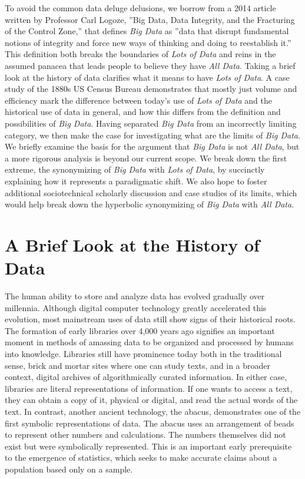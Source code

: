 \documentclass[sigconf]{acmart}
\begin{document}
To avoid the common data deluge delusions, we borrow from a 2014 article written by Professor Carl Logoze, ''Big Data, Data Integrity, and the Fracturing of the Control Zone,'' that defines {\em Big Data} as ''data that disrupt fundamental notions of integrity and force new ways of thinking and doing to reestablish it.''\cite{Keystone} This definition both breaks the boundaries of {\em Lots of Data} and reins in the assumed panacea that leads people to believe they have {\em All Data}. Taking a brief look at the history of data clarifies what it means to have {\em Lots of Data}. A case study of the 1880s US Census Bureau demonstrates that mostly just volume and efficiency mark the difference between today's use of {\em Lots of Data} and the historical use of data in general, and how this differs from the definition and possibilities of {\em Big Data}. Having separated {\em Big Data} from an incorrectly limiting category, we then make the case for investigating what are the limits of {\em Big Data}. We briefly examine the basis for the argument that {\em Big Data} is not {\em All Data}, but a more rigorous analysis is beyond our current scope. We break down the first extreme, the synonymizing of {\em Big Data} with {\em Lots of Data}, by succinctly explaining how it represents a paradigmatic shift. We also hope to foster additional sociotechnical scholarly discussion and case studies of its limits, which would help break down the hyperbolic synonymizing of {\em Big Data} with {\em All Data}.

\section{A Brief Look at the History of Data}
The human ability to store and analyze data has evolved gradually over millennia. Although digital computer technology greatly accelerated this evolution, most mainstream uses of data still show signs of their historical roots. The formation of early libraries over 4,000 years ago signifies an important moment in methods of amassing data to be organized and processed by humans into knowledge.\cite{Data_History} Libraries still have prominence today both in the traditional sense, brick and mortar sites where one can study texts, and in a broader context, digital archives of algorithmically curated information. In either case, libraries are literal representations of information. If one wants to access a text, they can obtain a copy of it, physical or digital, and read the actual words of the text.\cite{Keystone} In contrast, another ancient technology, the abacus, demonstrates one of the first symbolic representations of data. The abacus uses an arrangement of beads to represent other numbers and calculations. The numbers themselves did not exist but were symbolically represented. This is an important early prerequisite to the emergence of statistics, which seeks to make accurate claims about a population based only on a sample.\cite{Data_History}
\end{document}
